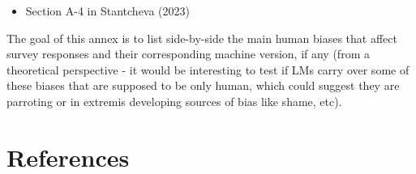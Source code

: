 \documentclass[
]{article}
\providecommand{\tightlist}{%
  \setlength{\itemsep}{0pt}\setlength{\parskip}{0pt}}\usepackage{longtable,booktabs,array}
\begin{document}
\begin{itemize}
\tightlist
\item
  Section A-4 in Stantcheva (2023)
\end{itemize}

The goal of this annex is to list side-by-side the main human biases
that affect survey responses and their corresponding machine version, if
any (from a theoretical perspective - it would be interesting to test if
LMs carry over some of these biases that are supposed to be only human,
which could suggest they are parroting or in extremis developing sources
of bias like shame, etc).

\section*{References}\label{references}
\end{document}
